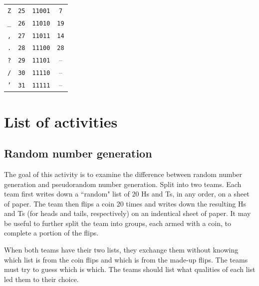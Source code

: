 \documentclass{book}
\theoremstyle{plain}
\theoremstyle{definition}
\begin{document}
\begin{center}
\begin{tabular}{cccc}
\texttt{Z}  & \texttt{25} & \texttt{11001} & \texttt{7} \\
\texttt{\_} & \texttt{26} & \texttt{11010} & \texttt{19} \\
\texttt{,}  & \texttt{27} & \texttt{11011} & \texttt{14} \\
\texttt{.}  & \texttt{28} & \texttt{11100} & \texttt{28} \\
\rowcolor{gray!50}
\texttt{?}  & \texttt{29} & \texttt{11101} & -- \\
\rowcolor{gray!50}
\texttt{/}  & \texttt{30} & \texttt{11110} & -- \\
\rowcolor{gray!50}
\texttt{'}  & \texttt{31} & \texttt{11111} & -- \\
\end{tabular}
\end{center}

\chapter{List of activities}
\section{Random number generation}
The goal of this activity is to examine the difference between random number generation and pseudorandom number generation. Split into two teams. Each team first writes down a ``random" list of 20 Hs and Ts, in any order, on a sheet of paper. The team then flips a coin 20 times and writes down the resulting Hs and Ts (for heads and tails, respectively) on an indentical sheet of paper. It may be useful to further split the team into groups, each armed with a coin, to complete a portion of the flips.

When both teams have their two lists, they exchange them without knowing which list is from the coin flips and which is from the made-up flips. The teams must try to guess which is which. The teams should list what qualities of each list led them to their choice.
\end{document}
